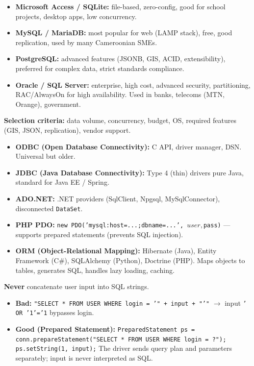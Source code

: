 \documentclass[11pt]{article}
\begin{document}
\begin{savaistu}
\begin{itemize}
\item \textbf{Microsoft Access / SQLite:} file-based, zero-config, good for school projects, desktop apps, low concurrency.
\item \textbf{MySQL / MariaDB:} most popular for web (LAMP stack), free, good replication, used by many Cameroonian SMEs.
\item \textbf{PostgreSQL:} advanced features (JSONB, GIS, ACID, extensibility), preferred for complex data, strict standards compliance.
\item \textbf{Oracle / SQL Server:} enterprise, high cost, advanced security, partitioning, RAC/AlwaysOn for high availability. Used in banks, telecoms (MTN, Orange), government.
\end{itemize}
\textbf{Selection criteria:} data volume, concurrency, budget, OS, required features (GIS, JSON, replication), vendor support.
\end{savaistu}

\begin{definition}
\begin{itemize}
\item \textbf{ODBC (Open Database Connectivity):} C API, driver manager, DSN. Universal but older.
\item \textbf{JDBC (Java Database Connectivity):} Type 4 (thin) drivers pure Java, standard for Java EE / Spring.
\item \textbf{ADO.NET:} .NET providers (SqlClient, Npgsql, MySqlConnector), disconnected \texttt{DataSet}.
\item \textbf{PHP PDO:} \texttt{new PDO('mysql:host=...;dbname=...', $user, $pass)} — supports prepared statements (prevents SQL injection).
\item \textbf{ORM (Object-Relational Mapping):} Hibernate (Java), Entity Framework (C\#), SQLAlchemy (Python), Doctrine (PHP). Maps objects to tables, generates SQL, handles lazy loading, caching.
\end{itemize}
\end{definition}

\begin{attention}
\textbf{Never} concatenate user input into SQL strings.
\begin{itemize}
\item \textbf{Bad:} \texttt{"SELECT * FROM USER WHERE login = '" + input + "'"} $\to$ input \texttt{' OR '1'='1} bypasses login.
\item \textbf{Good (Prepared Statement):} \texttt{PreparedStatement ps = conn.prepareStatement("SELECT * FROM USER WHERE login = ?"); ps.setString(1, input);} The driver sends query plan and parameters separately; input is never interpreted as SQL.
\end{itemize}
\end{attention}
\end{document}
